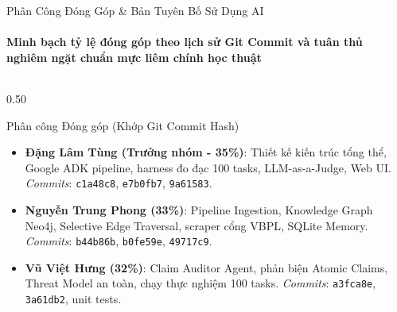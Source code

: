 \documentclass[aspectratio=169,10pt,xcolor={table}]{beamer}
\begin{document}
\begin{frame}{Phân Công Đóng Góp \& Bản Tuyên Bố Sử Dụng AI}
\framesubtitle{Minh bạch tỷ lệ đóng góp theo lịch sử Git Commit và tuân thủ nghiêm ngặt chuẩn mực liêm chính học thuật}
\begin{columns}[T]
\begin{column}{0.50\textwidth}
\begin{block}{\small Phân công Đóng góp (Khớp Git Commit Hash)}
\scriptsize
\begin{itemize}
  \item \textbf{Đặng Lâm Tùng (Trưởng nhóm - 35\%)}:
    \newline Thiết kế kiến trúc tổng thể, Google ADK pipeline, harness đo đạc 100 tasks, LLM-as-a-Judge, Web UI.
    \newline \textit{Commits}: \texttt{c1a48c8}, \texttt{e7b0fb7}, \texttt{9a61583}.
  \item \textbf{Nguyễn Trung Phong (33\%)}:
    \newline Pipeline Ingestion, Knowledge Graph Neo4j, Selective Edge Traversal, scraper cổng VBPL, SQLite Memory.
    \newline \textit{Commits}: \texttt{b44b86b}, \texttt{b0fe59e}, \texttt{49717c9}.
  \item \textbf{Vũ Việt Hưng (32\%)}:
    \newline Claim Auditor Agent, phản biện Atomic Claims, Threat Model an toàn, chạy thực nghiệm 100 tasks.
    \newline \textit{Commits}: \texttt{a3fca8e}, \texttt{3a61db2}, unit tests.
\end{itemize}
\end{block}
\end{column}


\end{columns}
\end{frame}
\end{document}
